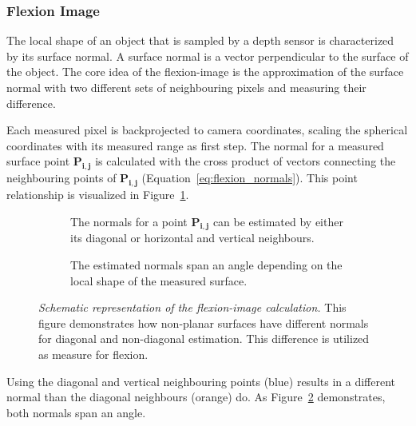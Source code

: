 \subsubsection{Flexion Image}\label{flexion-image-section}

The local shape of an object that is sampled by a depth sensor is characterized by its surface normal.
A surface normal is a vector perpendicular to the surface of the object.
The core idea of the \Gls{flexion-image} is the approximation of the surface normal with two different sets of neighbouring pixels and measuring their difference.

Each measured pixel is backprojected to camera coordinates, scaling the spherical coordinates with its measured range as first step.
The normal for a measured surface point $\mathbf{P_{i,j}}$ is calculated with the cross product of vectors connecting the neighbouring points of $\mathbf{P_{i,j}}$ (Equation~\ref{eq:flexion_normals}).
This point relationship is visualized in Figure~\ref{fig:flexion_normals_plane}.
\begin{figure}[ht]
    \begin{subfigure}[t]{0.48\linewidth}
        \centering
        \scalebox{1.0}{%
        
        }
        \caption{The normals for a point $\mathbf{P_{i,j}}$ can be estimated by either its diagonal or horizontal and vertical neighbours.}\label{fig:flexion_normals_plane}
    \end{subfigure}\quad
    \begin{subfigure}[t]{0.49\linewidth}
        \centering
        \scalebox{1.0}{%
        
        }
        \caption{The estimated normals span an angle depending on the local shape of the measured surface.}\label{fig:flexion_space}
    \end{subfigure}
    \caption[Schematic representation of the \gls{flexion-image} calculation]{\emph{Schematic representation of the \gls{flexion-image} calculation.} This figure demonstrates how non-planar surfaces have different normals for diagonal and non-diagonal estimation. This difference is utilized as measure for flexion.}%
    \label{fig:flexion-image-scetched}
\end{figure}
Using the diagonal and vertical neighbouring points (blue) results in a different normal than the diagonal neighbours (orange) do.
As Figure~\ref{fig:flexion_space} demonstrates, both normals span an angle.

